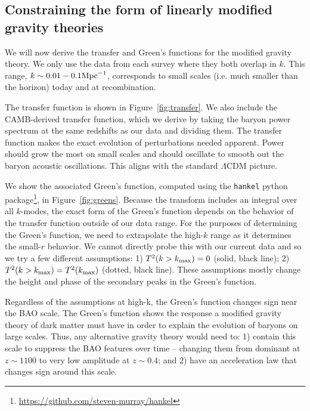 \documentclass[floats,floatfix,showpacs,amssymb,amsmath,prl,twocolumn,superscriptaddress,nofootinbib, aps]{revtex4-2}
\begin{document}
\subsection{Constraining the form of linearly modified gravity theories}
We will now derive the transfer and Green's functions for the modified gravity theory. We only use the data from each survey where they both overlap in $k$.  This range, $k\sim0.01 - 0.1\rm{Mpc}^{-1}$, corresponds to small scales (i.e. much smaller than the horizon) today and at recombination.

The transfer function is shown in Figure~\ref{fig:transfer}. We also include the CAMB-derived transfer function, which we derive by taking the baryon power spectrum at the same redshifts as our data and dividing them. The transfer function makes the exact evolution of perturbations needed apparent. Power should grow the most on small scales and should oscillate to smooth out the baryon acoustic oscillations. This aligns with the standard $\Lambda$CDM picture.

We show the associated Green's function, computed using the \texttt{hankel} python package\footnote{\url{https://github.com/steven-murray/hankel}}, in Figure~\ref{fig:greens}. Because the transform includes an integral over all $k$-modes, the exact form of the Green's function depends on the behavior of the transfer function outside of our data range. For the purposes of determining the Green's function, we need to extrapolate the high-$k$ range as it determines the small-$r$ behavior. We cannot directly probe this with our current data and so we try a few different assumptions: 1) $T^2(k>k_{\rm{max}}) = 0$ (solid, black line); 2) $T^2(k>k_{\rm{max}}) = T^2(k_{\rm{max}})$ (dotted, black line). These assumptions mostly change the height and phase of the secondary peaks in the Green's function.

Regardless of the assumptions at high-k, the Green's function changes sign near the BAO scale. The Green's function shows the response a modified gravity theory of dark matter must have in order to explain the evolution of baryons on large scales. Thus, any alternative gravity theory would need to: 1) contain this scale to suppress the BAO features over time -- changing them from dominant at $z\sim 1100$ to very low amplitude at $z\sim 0.4$; and 2) have an acceleration law that changes sign around this scale.
\end{document}
